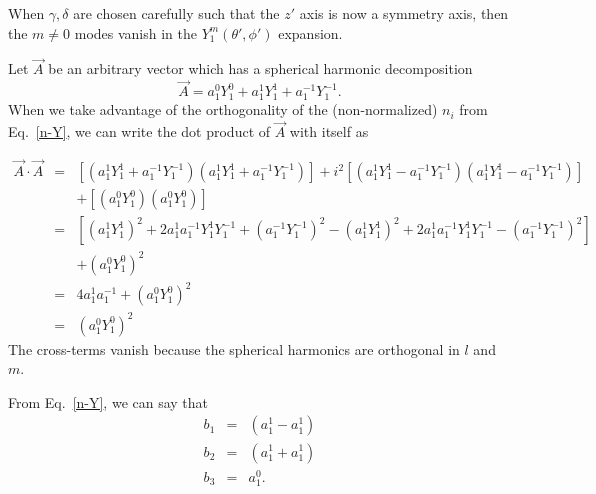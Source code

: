 \documentclass[11pt]{article}
\begin{document}
\noindent
When $\gamma, \delta$ are chosen carefully such that the $z'$ axis is now a symmetry axis, then the $m \ne 0$ modes vanish in the $Y_1^m(\theta', \phi')$ expansion.

\newpage
\noindent
Let $\vec{A}$ be an arbitrary vector which has a spherical harmonic decomposition
\begin{equation}
\vec{A} = a_1^{0} Y_1^{0} + a_1^{1} Y_1^{1} + a_1^{-1} Y_1^{-1}.
\end{equation}
When we take advantage of the orthogonality of the 
(non-normalized)
$n_i$ from Eq.~\ref{n-Y}, we can write the dot product of $\vec{A}$ with itself  as
\begin{comment}
\begin{eqnarray}
\vec{A} \cdot \vec{A} &=& 
\left[ \frac{1}{4}\frac{8 \pi}{3} (a_1^{1} Y_1^{1} - a_1^{1} Y_1^{1}) (a_1^{1} Y_1^{1} - a_1^{1} Y_1^{1}) \right]
+\left[ \frac{-1}{4}\frac{8 \pi}{3} (a_1^{1} Y_1^{1} + a_1^{1} Y_1^{1}) (a_1^{1} Y_1^{1} + a_1^{1} Y_1^{1}) \right] \\ \nonumber
&&+ \left[ \frac{4 \pi}{3} (a_1^{0})(a_1^{0}) \right] \\
&=& \frac{2 \pi}{3} \left[ (a_1^{1})^2 + 2 a_1^{1} a_1^{-1}  + (a_1^{-1})^2 
- (a_1^{1})^2 + 2 a_1^{1} a_1^{-1} - (a_1^{-1})^2 \right] +   \frac{4 \pi}{3} (a_1^{0})^2 \\
&=& \frac{8 \pi}{3} a_1^{1} a_1^{-1} +  \frac{4 \pi}{3} (a_1^{0})^2 
\end{eqnarray}
\end{comment}
\begin{eqnarray}
\vec{A} \cdot \vec{A} &=& 
\left[  (a_1^{1} Y_1^{1} + a_1^{-1} Y_1^{-1}) (a_1^{1} Y_1^{1} + a_1^{-1} Y_1^{-1}) \right]
+ i^2 \left[  (a_1^{1} Y_1^{1} - a_1^{-1} Y_1^{-1}) (a_1^{1} Y_1^{1} - a_1^{-1} Y_1^{-1}) \right] \\ \nonumber
&&+ \left[  (a_1^{0}Y_1^{0})(a_1^{0}Y_1^{0}) \right] \\
&=& \left[ (a_1^{1}Y_1^{1})^2 + 2 a_1^{1} a_1^{-1}Y_1^{1}Y_1^{-1}  + (a_1^{-1}Y_1^{-1})^2 
- (a_1^{1}Y_1^{1})^2 + 2 a_1^{1} a_1^{-1}Y_1^{1}Y_1^{-1} - (a_1^{-1}Y_1^{-1})^2 \right]  \\ \nonumber
&&+    (a_1^{0}Y_1^{0})^2 \\
&=& 4 a_1^{1} a_1^{-1} +   (a_1^{0}Y_1^{0})^2 \\
&=&    (a_1^{0}Y_1^{0})^2 
\end{eqnarray}
The cross-terms vanish because the spherical harmonics are orthogonal in $l$ and $m$.


From Eq.~\ref{n-Y}, we can say that
\begin{eqnarray}
b_1 &=& (a_1^{1}-a_1^{1}) \\
b_2 &=& (a_1^{1}+a_1^{1}) \\
b_3 &=& a_1^{0}.
\end{eqnarray}














%
%
\end{document}
